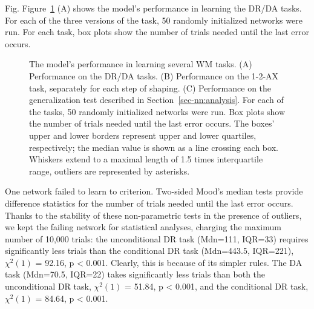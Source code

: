 \documentclass[
  11pt,
  a4paper,
]{scrbook}
\begin{document}
Fig. Figure~\ref{fig-nn:fig4} (A) shows the model's performance in
learning the DR/DA tasks. For each of the three versions of the task, 50
randomly initialized networks were run. For each task, box plots show
the number of trials needed until the last error occurs.

\begin{figure}


\caption{\label{fig-nn:fig4}The model's performance in learning several
WM tasks. (A) Performance on the DR/DA tasks. (B) Performance on the
1-2-AX task, separately for each step of shaping. (C) Performance on the
generalization test described in Section~\ref{sec-nn:analysis}. For each
of the tasks, 50 randomly initialized networks were run. Box plots show
the number of trials needed until the last error occurs. The boxes'
upper and lower borders represent upper and lower quartiles,
respectively; the median value is shown as a line crossing each box.
Whiskers extend to a maximal length of 1.5 times interquartile range,
outliers are represented by asterisks.}

\end{figure}%

One network failed to learn to criterion. Two-sided Mood's median tests
provide difference statistics for the number of trials needed until the
last error occurs. Thanks to the stability of these non-parametric tests
in the presence of outliers, we kept the failing network for statistical
analyses, charging the maximum number of 10,000 trials: the
unconditional DR task (Mdn=111, IQR=33) requires significantly less
trials than the conditional DR task (Mdn=443.5, IQR=221), \(\chi^2(1)\)
= 92.16, p \textless{} 0.001. Clearly, this is because of its simpler
rules. The DA task (Mdn=70.5, IQR=22) takes significantly less trials
than both the unconditional DR task, \(\chi^2(1)\) = 51.84, p
\textless{} 0.001, and the conditional DR task, \(\chi^2(1)\) = 84.64, p
\textless{} 0.001.
\end{document}
